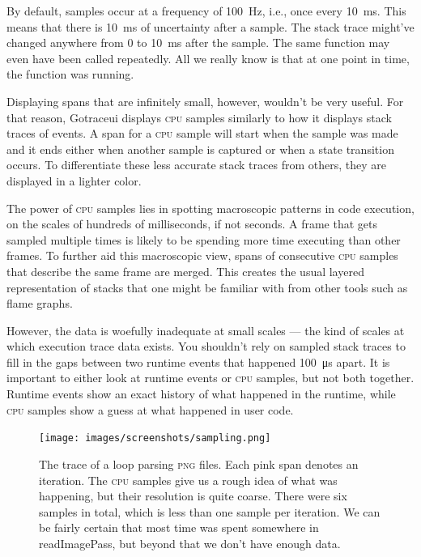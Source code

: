 \documentclass[10pt,letterpaper,oneside,openany,english]{memoir}
\newcommand{\code}[1]{{\ttfamily\mbox{#1}}}
\begin{document}
By default, samples occur at a frequency of \qty{100}{\hertz}, i.e., once every \qty{10}{\milli\second}.
This means that there is \qty{10}{\milli\second} of uncertainty after a sample.
The stack trace might've changed anywhere from \num{0} to \qty{10}{\milli\second} after the sample.
The same function may even have been called repeatedly.
All we really know is that at one point in time, the function was running.

Displaying spans that are infinitely small, however, wouldn't be very useful.
For that reason, Gotraceui displays \textsc{cpu} samples similarly to how it displays stack traces of events.
A span for a \textsc{cpu} sample will start when the sample was made and it ends either when another sample is captured or when a state transition occurs.
To differentiate these less accurate stack traces from others, they are displayed in a lighter color.

The power of \textsc{cpu} samples lies in spotting macroscopic patterns in code execution, on the scales of hundreds of milliseconds, if not seconds.
A frame that gets sampled multiple times is likely to be spending more time executing than other frames.
To further aid this macroscopic view, spans of consecutive \textsc{cpu} samples that describe the same frame are merged.
This creates the usual layered representation of stacks that one might be familiar with from other tools such as flame graphs.

However, the data is woefully inadequate at small scales --- the kind of scales at which execution trace data exists.
You shouldn't rely on sampled stack traces to fill in the gaps between two runtime events that happened \qty{100}{\micro\second} apart.
It is important to either look at runtime events or \textsc{cpu} samples, but not both together.
Runtime events show an exact history of what happened in the runtime, while \textsc{cpu} samples show a guess at what happened in user code.

\begin{figure}[h]
\texttt{[image: images/screenshots/sampling.png]}
\caption{
  The trace of a loop parsing \textsc{png} files.
  Each pink span denotes an iteration.
  The \textsc{cpu} samples give us a rough idea of what was happening, but their resolution is quite coarse.
  There were six samples in total, which is less than one sample per iteration.
  We can be fairly certain that most time was spent somewhere in \code{readImagePass}, but beyond that we don't have enough data.
}
\end{figure}
\end{document}
